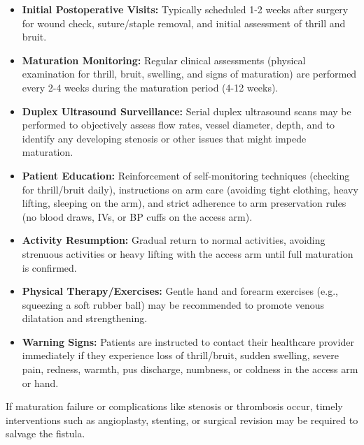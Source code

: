 \begin{itemize}
  \item \textbf{Initial Postoperative Visits:} Typically scheduled 1-2 weeks after surgery for wound check, suture/staple removal, and initial assessment of thrill and bruit.
  
  \item \textbf{Maturation Monitoring:} Regular clinical assessments (physical examination for thrill, bruit, swelling, and signs of maturation) are performed every 2-4 weeks during the maturation period (4-12 weeks).
  
  \item \textbf{Duplex Ultrasound Surveillance:} Serial duplex ultrasound scans may be performed to objectively assess flow rates, vessel diameter, depth, and to identify any developing stenosis or other issues that might impede maturation.
  
  \item \textbf{Patient Education:} Reinforcement of self-monitoring techniques (checking for thrill/bruit daily), instructions on arm care (avoiding tight clothing, heavy lifting, sleeping on the arm), and strict adherence to arm preservation rules (no blood draws, IVs, or BP cuffs on the access arm).
  
  \item \textbf{Activity Resumption:} Gradual return to normal activities, avoiding strenuous activities or heavy lifting with the access arm until full maturation is confirmed.
  
  \item \textbf{Physical Therapy/Exercises:} Gentle hand and forearm exercises (e.g., squeezing a soft rubber ball) may be recommended to promote venous dilatation and strengthening.
  
  \item \textbf{Warning Signs:} Patients are instructed to contact their healthcare provider immediately if they experience loss of thrill/bruit, sudden swelling, severe pain, redness, warmth, pus discharge, numbness, or coldness in the access arm or hand.
\end{itemize}

If maturation failure or complications like stenosis or thrombosis occur, timely interventions such as angioplasty, stenting, or surgical revision may be required to salvage the fistula.

